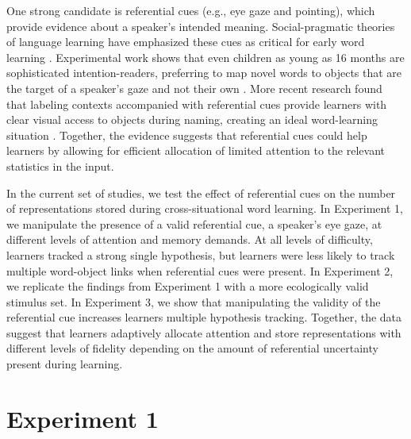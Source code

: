\documentclass[10pt,letterpaper]{article}
\begin{document}
One strong candidate is referential cues (e.g., eye gaze and pointing), which provide evidence about a speaker's intended meaning. Social-pragmatic theories of language learning have emphasized these cues as critical for early word learning  \cite{bloom2002children, clark2009first}. Experimental work shows that even children as young as 16 months are sophisticated intention-readers, preferring to map novel words to objects that are the target of a speaker's gaze and not their own \cite{baldwin1993infants}. More recent research found that labeling contexts accompanied with referential cues provide learners with clear visual access to objects during naming, creating an ideal word-learning situation \cite{yu2012embodied}. Together, the evidence suggests that referential cues could help learners by allowing for efficient allocation of limited attention to the relevant statistics in the input.

In the current set of studies, we test the effect of referential cues on the number of representations stored during cross-situational word learning. In Experiment 1, we manipulate the presence of a valid referential cue, a speaker's eye gaze, at different levels of attention and memory demands. At all levels of difficulty, learners tracked a strong single hypothesis, but learners were less likely to track multiple word-object links when referential cues were present. In Experiment 2, we replicate the findings from Experiment 1 with a more ecologically valid stimulus set. In Experiment 3, we show that manipulating the validity of the referential cue increases learners multiple hypothesis tracking. Together, the data suggest that learners adaptively allocate attention and store representations with different levels of fidelity depending on the amount of referential uncertainty present during learning.	


\section{Experiment 1}
\end{document}
